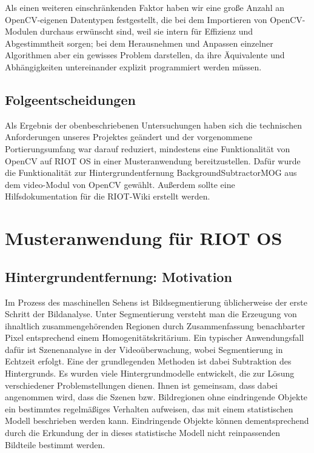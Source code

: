 \documentclass[10pt,a4paper]{article}
\begin{document}
Als einen weiteren einschränkenden Faktor haben wir eine große Anzahl an OpenCV-eigenen Datentypen festgestellt, die bei dem Importieren von OpenCV-Modulen durchaus erwünscht sind, weil sie intern für Effizienz und Abgestimmtheit sorgen; bei dem Herausnehmen und Anpassen einzelner Algorithmen aber ein gewisses Problem darstellen, da ihre Äquivalente und Abhängigkeiten untereinander explizit programmiert werden müssen.

\subsection{Folgeentscheidungen}

Als Ergebnis der obenbeschriebenen Untersuchungen haben sich die technischen Anforderungen unseres Projektes geändert und der vorgenommene Portierungsumfang war darauf reduziert, mindestens eine Funktionalität von OpenCV auf RIOT OS in einer Musteranwendung bereitzustellen. Dafür wurde die Funktionalität zur Hintergrundentfernung BackgroundSubtractorMOG aus dem video-Modul von OpenCV gewählt. Außerdem sollte eine Hilfsdokumentation für die RIOT-Wiki erstellt werden.

\newpage
\section{Musteranwendung für RIOT OS}

\subsection{Hintergrundentfernung: Motivation}

Im Prozess des maschinellen Sehens ist Bildsegmentierung üblicherweise der erste Schritt der Bildanalyse. Unter Segmentierung versteht man die Erzeugung von ihnaltlich zusammengehörenden Regionen durch Zusammenfassung benachbarter Pixel entsprechend einem Homogenitätskritärium. Ein typischer Anwendungsfall dafür ist Szenenanalyse in der Videoüberwachung, wobei Segmentierung in Echtzeit erfolgt. Eine der grundlegenden Methoden ist dabei Subtraktion des Hintergrunds. Es wurden viele Hintergrundmodelle entwickelt, die zur Lösung verschiedener Problemstellungen dienen. Ihnen ist gemeinsam, dass dabei angenommen wird, dass die Szenen bzw. Bildregionen ohne eindringende Objekte ein bestimmtes regelmäßiges Verhalten aufweisen, das mit einem statistischen Modell beschrieben werden kann. Eindringende Objekte können dementsprechend durch die Erkundung der in dieses statistische Modell nicht reinpassenden Bildteile bestimmt werden. \\
\end{document}
